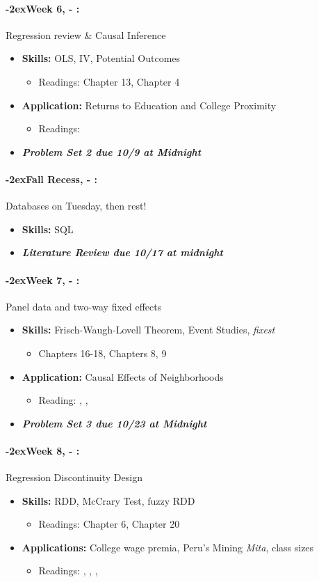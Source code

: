 \documentclass[11pt]{article}
\newcommand{\week}[1]{%
  \paragraph*{\kern-2ex\quad #1, \AdvanceDate[1]\syldate{\today} - \AdvanceDate[2]\syldate{\today}:}%
  \ifdim\wd1=\wd\MONDAY
    \AdvanceDate[7]
  \else
    \AdvanceDate[7]
  \fi%
}
\begin{document}
\week{Week 6} Regression review \& Causal Inference
\begin{itemize}
  \item \textbf{Skills:} OLS, IV, Potential Outcomes
  \begin{itemize}
    \item Readings: \cite{hungtintonklein2023effect} Chapter 13, \cite{cunningham2023mixtape} Chapter 4
  \end{itemize}
  \item \textbf{Application:} Returns to Education and College Proximity
  \begin{itemize}
    \item Readings: \textbf{\cite{card1993college}}
  \end{itemize}
  \item \textit{\textbf{Problem Set 2 due 10/9 at Midnight}}
\end{itemize}
\week{Fall Recess} Databases on Tuesday, then rest!
\begin{itemize}
  \item \textbf{Skills:} SQL
  \item \textit{\textbf{Literature Review due 10/17 at midnight}}
\end{itemize}
\week{Week 7} Panel data and two-way fixed effects
\begin{itemize}
  \item \textbf{Skills:} Frisch-Waugh-Lovell Theorem, Event Studies, \textit{fixest}
  \begin{itemize}
    \item \cite{hungtintonklein2023effect} Chapters 16-18, \cite{cunningham2023mixtape} Chapters 8, 9
  \end{itemize}
  \item \textbf{Application:} Causal Effects of Neighborhoods
  \begin{itemize}
    \item Reading: \textbf{\cite{chetty2018neighborhoods}}, \textbf{\cite{chetty2019moving}}, \textbf{\cite{chetty2016moving}}
  \end{itemize}
  \item \textit{\textbf{Problem Set 3 due 10/23 at Midnight}}
\end{itemize}
\week{Week 8} Regression Discontinuity Design
\begin{itemize}
  \item \textbf{Skills:} RDD, McCrary Test, fuzzy RDD
  \begin{itemize}
    \item Readings: \cite{cunningham2023mixtape} Chapter 6, \cite{hungtintonklein2023effect} Chapter 20
  \end{itemize}
  \item \textbf{Applications:} College wage premia, Peru's Mining \textit{Mita}, class sizes
  \begin{itemize}
    \item Readings: \textbf{\cite{dell2010mita}}, \textbf{\cite{zimmerman2014returns}}, \textbf{\cite{angrist1999maimonides}}, \cite{chetty2023diversifying}
  \end{itemize}
\end{itemize}
\end{document}
